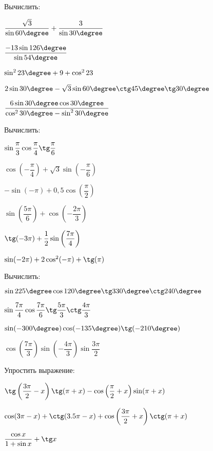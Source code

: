 \begin{class}[number=5]
	\begin{listofex}
		\item Вычислить:
		\begin{enumcols}[itemcolumns=2]
			\item \( \dfrac{\sqrt{3}}{\sin60\degree}+\dfrac{3}{\sin30\degree} \)
			\item \( \dfrac{-13\sin126\degree}{\sin54\degree} \)
			\item \( \sin^223\degree+9+\cos^223 \)
			\item \( 2\sin30\degree-\sqrt{3}\sin60\degree\ctg45\degree\tg30\degree\)
			\item \( \dfrac{6\sin30\degree\cos30\degree}{\cos^230\degree-\sin^230\degree} \)
		\end{enumcols}
		\item Вычислить:
		\begin{enumcols}[itemcolumns=2]
			\item \( \sin\dfrac{\pi}{3}\cos\dfrac{\pi}{4}\tg\dfrac{\pi}{6} \)
			\item \( \cos\left( -\dfrac{\pi}{4} \right)+\sqrt{3}\sin\left( -\dfrac{\pi}{6} \right) \)
			\item \( -\sin(-\pi)+0,5\cos\left( \dfrac{\pi}{2} \right) \)
			\item \( \sin\left( \dfrac{5\pi}{6} \right)+\cos\left( -\dfrac{2\pi}{3} \right) \)
			\item \( \tg(-3\pi)+\dfrac{1}{2}\sin\left( \dfrac{7\pi}{4} \right) \)
			\item \( \sin(-2\pi)+2\cos^2(-\pi)+\tg(\pi) \)
		\end{enumcols}
		\item Вычислить:
		\begin{enumcols}[itemcolumns=2]
			\item \( \sin225\degree\cos120\degree\tg330\degree\ctg240\degree \)
			\item \( \sin\dfrac{7\pi}{4}\cos\dfrac{7\pi}{6}\tg\dfrac{5\pi}{3}\ctg\dfrac{4\pi}{3} \)
			\item \( \sin(-300\degree)\cos(-135\degree)\tg(-210\degree) \)
			\item \( \cos\left( \dfrac{7\pi}{3} \right)\sin\left( -\dfrac{4\pi}{3} \right)\sin\dfrac{3\pi}{2} \)
		\end{enumcols}
		\item Упростить выражение:
		\begin{enumcols}[itemcolumns=1]
			\item \( \tg\left( \dfrac{3\pi}{2}-x \right)\tg(\pi+x)-\cos\left( \dfrac{\pi}{2}+x \right)\sin(\pi+x) \)
			\item \( \cos(3\pi-x)+\ctg(3.5\pi-x)+\cos\left( \dfrac{3\pi}{2}+x \right)\ctg(\pi+x) \)
			\item \( \dfrac{\cos x}{1+\sin x}+\tg x \)
		\end{enumcols}
		\item {}
		\item {}
	\end{listofex}
\end{class}
